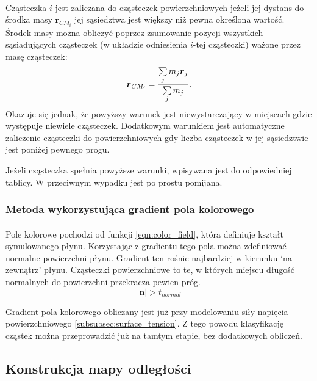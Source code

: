 \paragraph{}
Cząsteczka $i$ jest zaliczana do cząsteczek powierzchniowych jeżeli jej dystans do środka masy $\boldsymbol{r}_{CM_{i}}$ jej sąsiedztwa jest większy niż pewna określona wartość. Środek masy można obliczyć poprzez zsumowanie pozycji wszystkich sąsiadujących cząsteczek (w układzie odniesienia $i$-tej cząsteczki) ważone przez masę cząsteczek:
\begin{equation}
\boldsymbol{r}_{CM_{i}} = {{\sum\limits_{j} {m_j \boldsymbol{r}_{j}}} \over {\sum\limits_{j} {m_j}}}.
\label{eqn:center_mass}
\end{equation}
Okazuje się jednak, że powyższy warunek jest niewystarczający w miejscach gdzie występuje niewiele cząsteczek. Dodatkowym warunkiem jest automatyczne zaliczenie cząsteczki do powierzchniowych gdy liczba cząsteczek w jej sąsiedztwie jest poniżej pewnego progu.
\par
Jeżeli cząsteczka spełnia powyższe warunki, wpisywana jest do odpowiedniej tablicy. W przeciwnym wypadku jest po prostu pomijana.
\par
\subsubsection{Metoda wykorzystująca gradient pola kolorowego}

\paragraph{}
Pole kolorowe pochodzi od funkcji \eqref{eqn:color_field}, która definiuje kształt symulowanego płynu. Korzystając z gradientu tego pola można zdefiniować normalne powierzchni płynu. Gradient ten rośnie najbardziej w kierunku `na zewnątrz' płynu. Cząsteczki powierzchniowe to te, w których miejscu długość normalnych do powierzchni przekracza pewien próg.
\begin{equation}
|\boldsymbol{n}| > t_{normal}
\end{equation}
\par
Gradient pola kolorowego obliczany jest już przy modelowaniu siły napięcia powierzchniowego \eqref{subsubsec:surface_tension}. Z tego powodu klasyfikację cząstek można przeprowadzić już na tamtym etapie, bez dodatkowych obliczeń.
\par

\subsection{Konstrukcja mapy odległości}

